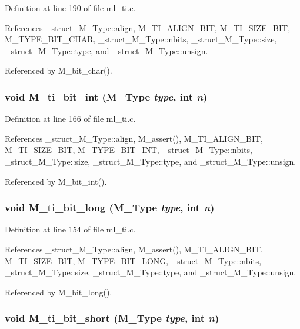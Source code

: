 Definition at line 190 of file ml\_\-ti.c.

References \_\-struct\_\-M\_\-Type::align, M\_\-TI\_\-ALIGN\_\-BIT, M\_\-TI\_\-SIZE\_\-BIT, M\_\-TYPE\_\-BIT\_\-CHAR, \_\-struct\_\-M\_\-Type::nbits, \_\-struct\_\-M\_\-Type::size, \_\-struct\_\-M\_\-Type::type, and \_\-struct\_\-M\_\-Type::unsign.

Referenced by M\_\-bit\_\-char().
\subsubsection{\setlength{\rightskip}{0pt plus 5cm}void M\_\-ti\_\-bit\_\-int (\bf{M\_\-Type} {\em type}, int {\em n})}\label{m__ti_8h_135f27fb35b9a0e08734f682ad2cdc2b}




Definition at line 166 of file ml\_\-ti.c.

References \_\-struct\_\-M\_\-Type::align, M\_\-assert(), M\_\-TI\_\-ALIGN\_\-BIT, M\_\-TI\_\-SIZE\_\-BIT, M\_\-TYPE\_\-BIT\_\-INT, \_\-struct\_\-M\_\-Type::nbits, \_\-struct\_\-M\_\-Type::size, \_\-struct\_\-M\_\-Type::type, and \_\-struct\_\-M\_\-Type::unsign.

Referenced by M\_\-bit\_\-int().
\subsubsection{\setlength{\rightskip}{0pt plus 5cm}void M\_\-ti\_\-bit\_\-long (\bf{M\_\-Type} {\em type}, int {\em n})}\label{m__ti_8h_0c40eb294d66cd69d1b997e777909bfb}




Definition at line 154 of file ml\_\-ti.c.

References \_\-struct\_\-M\_\-Type::align, M\_\-assert(), M\_\-TI\_\-ALIGN\_\-BIT, M\_\-TI\_\-SIZE\_\-BIT, M\_\-TYPE\_\-BIT\_\-LONG, \_\-struct\_\-M\_\-Type::nbits, \_\-struct\_\-M\_\-Type::size, \_\-struct\_\-M\_\-Type::type, and \_\-struct\_\-M\_\-Type::unsign.

Referenced by M\_\-bit\_\-long().
\subsubsection{\setlength{\rightskip}{0pt plus 5cm}void M\_\-ti\_\-bit\_\-short (\bf{M\_\-Type} {\em type}, int {\em n})}\label{m__ti_8h_f6e972f8879fedcf0a74ccd8e9d1747f}




